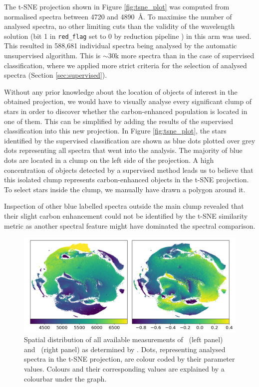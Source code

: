 The t-SNE projection shown in Figure \ref{fig:tsne_plot} was computed from normalised spectra between 4720 and 4890~\AA. To maximise the number of analysed spectra, no other limiting cuts than the validity of the wavelength solution (bit 1 in \texttt{red\_flag} set to 0 by reduction pipeline \cite{2017MNRAS.464.1259K}) in this arm was used. This resulted in 588,681 individual spectra being analysed by the automatic unsupervised algorithm. This is $\sim30$k more spectra than in the case of supervised classification, where we applied more strict criteria for the selection of analysed spectra (Section \ref{sec:supervised}). 

Without any prior knowledge about the location of objects of interest in the obtained projection, we would have to visually analyse every significant clump of stars in order to discover whether the carbon-enhanced population is located in one of them. This can be simplified by adding the results of the supervised classification into this new projection. In Figure \ref{fig:tsne_plot}, the stars identified by the supervised classification are shown as blue dots plotted over grey dots representing all spectra that went into the analysis. The majority of blue dots are located in a clump on the left side of the projection. A high concentration of objects detected by a supervised method leads us to believe that this isolated clump represents carbon-enhanced objects in the t-SNE projection. To select stars inside the clump, we manually have drawn a polygon around it.

Inspection of other blue labelled spectra outside the main clump revealed that their slight carbon enhancement could not be identified by the t-SNE similarity metric as another spectral feature might have dominated the spectral comparison.

\begin{figure}
	\centering
	\includegraphics[width=\textwidth]{tsne_params_notitle.png}
	\caption{Spatial distribution of all available measurements of \Teff\ (left panel) and \Feh\ (right panel) as determined by \TC. Dots, representing analysed spectra in the t-SNE projection, are colour coded by their parameter values. Colours and their corresponding values are explained by a colourbar under the graph.}
	\label{fig:tsne_teff_feh}
\end{figure}

